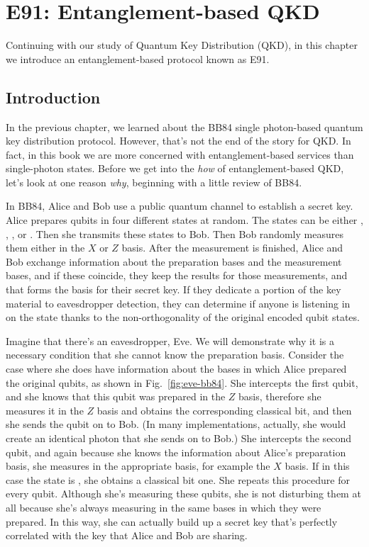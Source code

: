 \chapter{E91: Entanglement-based QKD}

Continuing with our study of Quantum Key Distribution (QKD), in this chapter we introduce an entanglement-based protocol known as E91.

\section{Introduction}


In the previous chapter, we learned about the BB84 single photon-based quantum key distribution protocol. However, that's not the end of the story for QKD.  In fact, in this book we are more concerned with entanglement-based services than single-photon states.  Before we get into the \emph{how} of entanglement-based QKD, let's look at one reason \emph{why}, beginning with a little review of BB84.

In BB84, Alice and Bob use a public quantum channel to establish a secret key.  Alice prepares qubits in four different states at random. The states can be either , , \ket{+}, or \ket{-}. Then she transmits these states to Bob. Then Bob randomly measures them either in the $X$ or $Z$ basis. After the measurement is finished, Alice and Bob exchange information about the preparation bases and the measurement bases, and if these coincide, they keep the results for those measurements, and that forms the basis for their secret key. If they dedicate a portion of the key material to eavesdropper detection, they can determine if anyone is listening in on the state thanks to the non-orthogonality of the original encoded qubit states.

Imagine that there's an eavesdropper, Eve. We will demonstrate why it is a necessary condition that she cannot know the preparation basis. Consider the case where she does have information about the bases in which Alice prepared the original qubits, as shown in Fig.~\ref{fig:eve-bb84}. She intercepts the first qubit, and she knows that this qubit was prepared in the $Z$ basis, therefore she measures it in the $Z$ basis and obtains the corresponding classical bit, and then she sends the qubit on to Bob. (In many implementations, actually, she would create an identical photon that she sends on to Bob.) She intercepts the second qubit, and again because she knows the information about Alice's preparation basis, she measures in the appropriate basis, for example the $X$ basis. If in this case the state is \ket{-}, she obtains a classical bit one. She repeats this procedure for every qubit.
Although she's measuring these qubits, she is not disturbing them at all because she's always measuring in the same bases in which they were prepared. In this way, she can actually build up a secret key that's perfectly correlated with the key that Alice and Bob are sharing.

